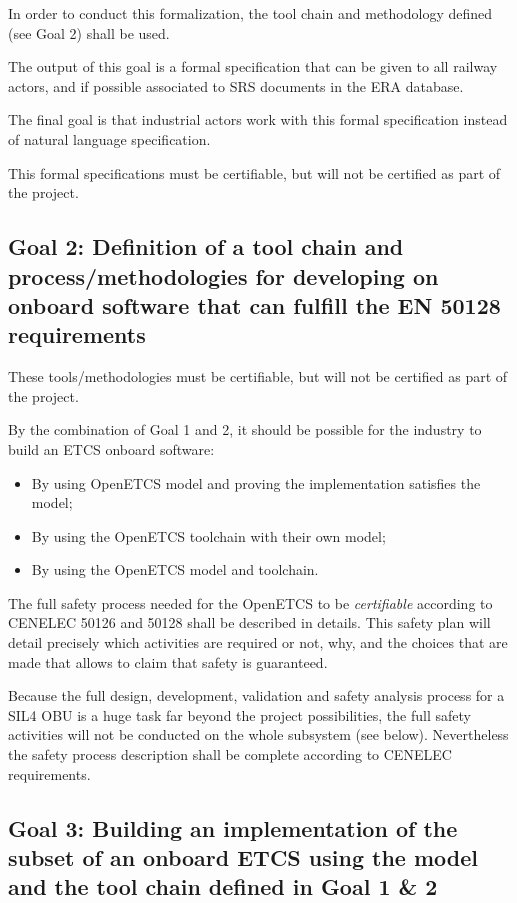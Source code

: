 \documentclass{template/openetcs_article}
\begin{document}
In order to conduct this formalization, the tool chain and methodology defined (see Goal 2) 
shall be used.

The output of this goal is a formal specification that can be given to all railway actors, and 
if possible associated to SRS documents in the ERA database.

The final goal is that industrial actors work with this formal specification instead of 
natural language specification.

This formal specifications must be certifiable, but will not be certified as part of the project. 

\subsection{Goal 2: Definition of a tool chain and process/methodologies for developing 
on onboard software that can fulfill the EN 50128 requirements}

These tools/methodologies must be certifiable, but will not be certified as part of the project.

By the combination of Goal 1 and 2, it should be possible for the industry to build an ETCS 
onboard software:
\begin{itemize}
\item By using OpenETCS model and proving the implementation satisfies the model;
\item By using the OpenETCS toolchain with their own model;
\item By using the OpenETCS model and toolchain.
\end{itemize}

The full safety process needed for the OpenETCS to be \emph{certifiable} according to CENELEC 50126
and 50128 shall be described in details. This safety plan will detail precisely which activities 
are required or not, why, and the choices that are made that allows to claim that safety is guaranteed.

Because the full design, development, validation and safety analysis process for a SIL4 OBU
is a huge task far beyond the project possibilities, the full safety activities will not be conducted
on the whole subsystem (see below). Nevertheless the safety process description shall be complete 
according to CENELEC requirements.

\subsection{Goal 3: Building an implementation of the subset of an onboard ETCS using the model and the 
tool chain defined in Goal 1 \& 2}
\end{document}
